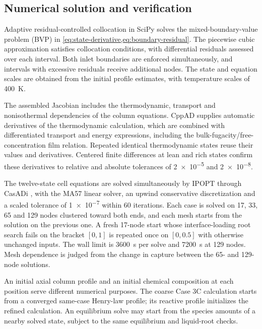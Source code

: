 \subsection{Numerical solution and verification}
Adaptive residual-controlled collocation in SciPy solves the mixed-boundary-value problem (BVP) in \cref{eq:state-derivative,eq:boundary-residual}.
The piecewise cubic approximation satisfies collocation conditions, with differential residuals assessed over each interval.
Both inlet boundaries are enforced simultaneously, and intervals with excessive residuals receive additional nodes.
The state and equation scales are obtained from the initial profile estimates, with temperature scales of \qty{400}{K}.

The assembled Jacobian includes the thermodynamic, transport and nonisothermal dependencies of the column equations.
CppAD supplies automatic derivatives of the thermodynamic calculation, which are combined with differentiated transport and energy expressions, including the bulk-fugacity/free-concentration film relation.
Repeated identical thermodynamic states reuse their values and derivatives.
Centered finite differences at lean and rich states confirm these derivatives to relative and absolute tolerances of \num{2e-5} and \num{2e-8}.

The twelve-state cell equations are solved simultaneously by IPOPT \cite{Wachter2006} through CasADi \cite{anderssonCasADiSoftwareFramework2019}, with the MA57 linear solver, an upwind conservative discretization and a scaled tolerance of \num{1e-7} within 60 iterations.
Each case is solved on 17, 33, 65 and 129 nodes clustered toward both ends, and each mesh starts from the solution on the previous one.
A fresh 17-node start whose interface-loading root search fails on the bracket $[0,1]$ is repeated once on $[0,0.5]$ with otherwise unchanged inputs.
The wall limit is \qty{3600}{s} per solve and \qty{7200}{s} at 129 nodes.
Mesh dependence is judged from the change in capture between the 65- and 129-node solutions.

An initial axial column profile and an initial chemical composition at each position serve different numerical purposes.
The coarse Case 3C calculation starts from a converged same-case Henry-law profile; its reactive profile initializes the refined calculation.
An equilibrium solve may start from the species amounts of a nearby solved state, subject to the same equilibrium and liquid-root checks.

